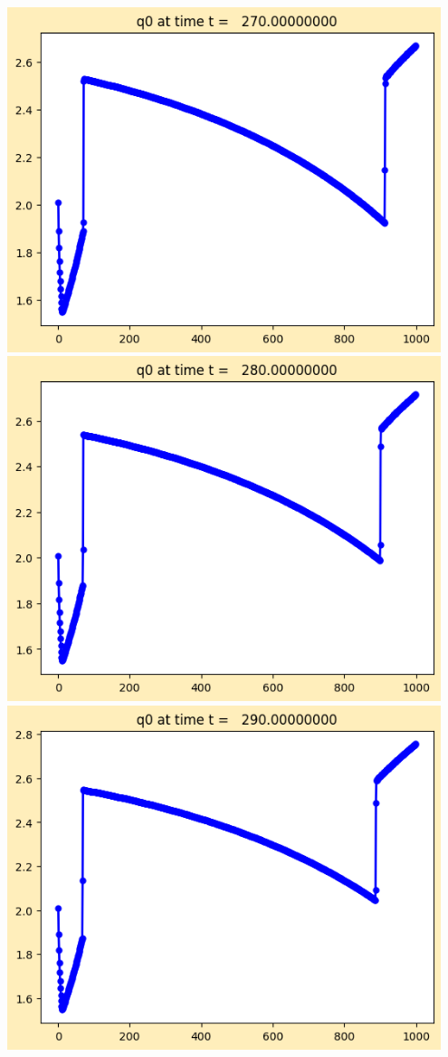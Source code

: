 \documentclass[11pt]{article}
\begin{document}
\vskip 10pt 
\includegraphics[width=0.95\textwidth]{frame0027fig1.png}
\vskip 10pt 
\includegraphics[width=0.95\textwidth]{frame0028fig1.png}
\vskip 10pt 
\includegraphics[width=0.95\textwidth]{frame0029fig1.png}
\end{document}
